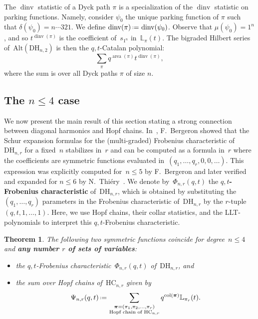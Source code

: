 \documentclass{amsart}
\newtheorem{theorem}{Theorem}[section]
\theoremstyle{definition}
\newcommand{\eqdef}{\mbox{\,\raisebox{0.2ex}{\scriptsize\ensuremath{\mathrm:}}\ensuremath{=}\,}} %
\newcommand{\defn}[1]{\textbf{\textsf{\color{PineGreen} #1}}} %
\newcommand{\DiagHarm}[2]{\mathrm{DH}_{#1,#2}} %
\newcommand{\area}{\operatorname{area}} %
\newcommand{\dinv}{\operatorname{dinv}} %
\newcommand{\col}{\operatorname{col}} %
\newcommand{\Alt}{\mathrm{Alt}} %
\newcommand{\HC}[2]{\mathrm{HC}_{#1,#2}} %
\newcommand{\bpi}{\boldsymbol \pi} %
\newcommand{\LLT}[2]{\mathbb{L}_{#1}(#2)} %
\begin{document}
The $\dinv$ statistic of a Dyck path $\pi$ is a specialization of the $\dinv$ statistic on parking functions. Namely, consider $\psi_0$ the unique parking function of $\pi$ such that $\delta(\psi_0)=n\cdots 321$. We define $\dinv(\pi) \eqdef \dinv(\psi_0)$. Observe that $\mu(\psi_0)=1^n$, and so 
$t^{\dinv(\pi)}$ is the coefficient of~$s_{1^n}$ in~$\LLT{\pi}{t}$. 
The bigraded Hilbert series of~$\Alt(\DiagHarm{n}{2})$ is then the $q,t$-Catalan polynomial:
\begin{equation}
\label{eq:qt_CatalanFormula}
\sum_{\pi} q^{\area(\pi)}  t^{\dinv(\pi)},
\end{equation}
where the sum is over all Dyck paths $\pi$ of size $n$.


\subsection{The $n\le 4$ case}

We now present the main result of this section stating a strong connection between diagonal harmonics and Hopf chains.
In~\cite{Bergeron-multivariateDiagonalCoinvariantSpaces}, F.~Bergeron showed that the Schur expansion formulas for the (multi-graded) 
Frobenius characteristic of~$\DiagHarm{n}{r}$ for a fixed~$n$ stabilizes in~$r$ and can be computed as a formula in~$r$ where the coefficients are symmetric functions evaluated in~$(q_1, \dots, q_r, 0, 0, \dots)$. This expression was explicitly computed for~$n \le 5$ by F.~Bergeron and later verified and expanded for $n \le 6$ by N.~Thi\'ery~\cite{Thiery}. 
We denote by~$\Phi_{n,r}(q,t)$ the \defn{$q,t$-Frobenius characteristic} of~$\DiagHarm{n}{r}$, which is obtained by substituting the~$(q_1, \dots, q_r)$ parameters in the Frobenius characteristic of~$\DiagHarm{n}{r}$ by the $r$-tuple~$(q, t, 1, \dots, 1)$.
Here, we use Hopf chains, their collar statistics, and the LLT-polynomials to interpret this $q,t$-Frobenius characteristic.

\begin{theorem}
\label{thm:LLT}
The following two symmetric functions coincide for degree~$n \le 4$ and \textbf{any number $r$ of sets of variables}:
\begin{itemize}
\item the $q,t$-Frobenius characteristic~$\Phi_{n,r}(q,t)$ of~$\DiagHarm{n}{r}$, and
\item the sum over Hopf chains of~$\HC{n}{r}$ given by
\[
\Psi_{n,r}(q,t) \eqdef \sum_{\substack{\bpi=(\pi_1,\pi_2,\dots ,\pi_r) \\ \text{Hopf chain of } \HC{n}{r}}}  q^{\col(\bpi)} \LLT{\pi_r}{t}.
\]
\end{itemize}
\end{theorem}
\end{document}
